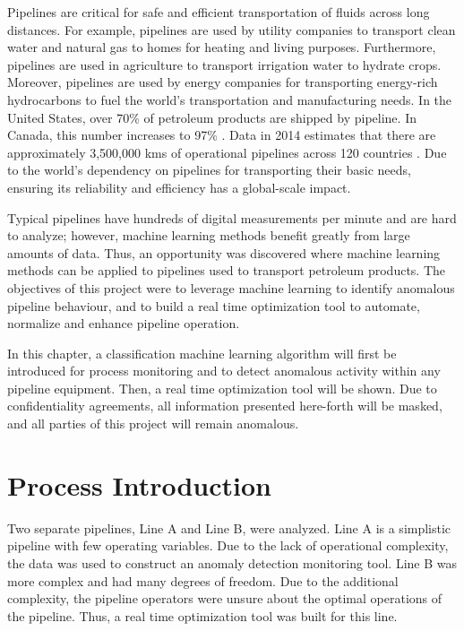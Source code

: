 Pipelines  are critical for safe and efficient transportation of fluids across long distances.  For example, pipelines are used by utility companies to transport clean water and natural gas to homes for heating and living purposes.  Furthermore, pipelines are used in agriculture to transport irrigation water to hydrate crops.  Moreover, pipelines are used by energy companies for transporting energy-rich hydrocarbons to fuel the world's transportation and manufacturing needs. In the United States, over 70\% of petroleum products are shipped by pipeline.  In Canada, this number increases to 97\% \cite{pipeline_transport}.  Data in 2014 estimates that there are approximately 3,500,000 kms of operational pipelines across 120 countries \cite{CIA_pipeline}. Due to the world's dependency on pipelines for transporting their basic needs, ensuring its reliability and efficiency has a global-scale impact.

Typical pipelines have hundreds of digital measurements per minute and are hard to analyze; however, machine learning methods benefit greatly from large amounts of data. Thus, an opportunity was discovered where machine learning methods can be applied to pipelines used to transport petroleum products. The objectives of this project were to leverage machine learning to identify anomalous pipeline behaviour, and to build a real time optimization tool to automate, normalize and enhance pipeline operation.

In this chapter, a classification machine learning algorithm will first be introduced for process monitoring and to detect anomalous activity within any pipeline equipment. Then, a real time optimization tool will be shown.  Due to confidentiality agreements, all information presented here-forth will be masked, and all parties of this project will remain anomalous.

\section{Process Introduction}
Two separate pipelines, Line A and Line B, were analyzed.  Line A is a simplistic pipeline with few operating variables. Due to the lack of operational complexity, the data was used to construct an anomaly detection monitoring tool.  Line B was more complex and had many degrees of freedom. Due to the additional complexity, the pipeline operators were unsure about the optimal operations of the pipeline.  Thus, a real time optimization tool was built for this line.


